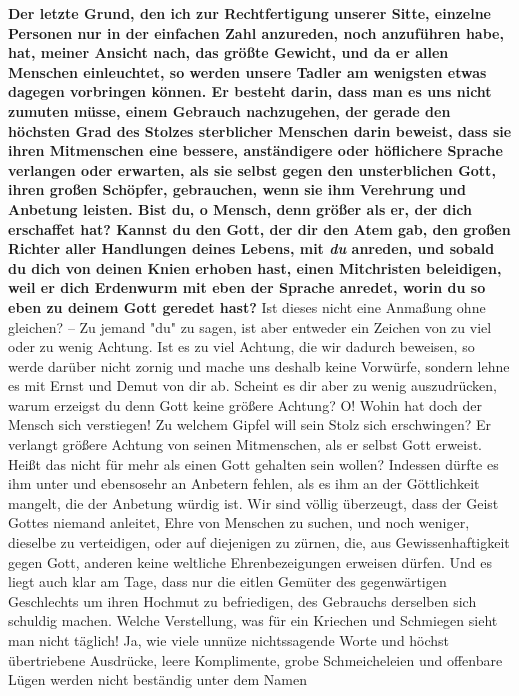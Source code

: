 \label{ref:10_08_duzen} \textbf{Der letzte Grund, den ich zur Rechtfertigung
unserer Sitte, einzelne Personen
nur in der einfachen Zahl anzureden, noch anzuführen habe, hat, meiner Ansicht
nach, das größte Gewicht, und da er allen Menschen einleuchtet, so werden unsere
Tadler am wenigsten etwas dagegen vorbringen können. Er besteht darin, dass man
es uns nicht zumuten müsse, einem Gebrauch nachzugehen, der gerade den
höchsten Grad des Stolzes sterblicher Menschen darin beweist, dass sie ihren
Mitmenschen eine bessere, anständigere oder höflichere Sprache verlangen oder
erwarten, als sie selbst gegen den unsterblichen Gott, ihren großen Schöpfer,
gebrauchen, wenn sie ihm Verehrung und Anbetung leisten.  Bist du, o Mensch, denn
größer als er, der dich erschaffet hat? Kannst du den Gott, der dir den Atem
gab, den großen Richter aller Handlungen deines Lebens, mit \textit{du}
anreden, und
sobald du dich von deinen Knien erhoben hast, einen Mitchristen beleidigen, weil
er dich Erdenwurm mit eben der Sprache anredet, worin du so
eben zu deinem Gott
geredet hast?} Ist dieses nicht eine Anmaßung ohne gleichen? -- Zu jemand "du" zu
sagen, ist aber entweder ein Zeichen von zu viel oder zu wenig Achtung. Ist
es zu viel Achtung, die wir dadurch beweisen, so werde darüber nicht zornig und
mache uns deshalb keine Vorwürfe, sondern lehne es mit Ernst und Demut von
dir ab. Scheint es dir aber zu wenig auszudrücken, warum erzeigst du denn Gott
keine größere Achtung? O! Wohin hat doch der Mensch sich verstiegen! Zu welchem
Gipfel will sein Stolz sich erschwingen? Er verlangt größere Achtung von seinen
Mitmenschen, als er selbst Gott erweist. Heißt das nicht für mehr als einen
Gott gehalten sein wollen? Indessen dürfte es ihm unter und ebensosehr an
Anbetern fehlen, als es ihm an der Göttlichkeit mangelt, die der Anbetung würdig
ist. Wir sind völlig überzeugt, dass der Geist Gottes niemand anleitet, Ehre von
Menschen zu suchen, und noch weniger, dieselbe zu verteidigen, oder auf
diejenigen zu zürnen, die, aus Gewissenhaftigkeit gegen Gott, anderen keine
weltliche Ehrenbezeigungen erweisen dürfen. Und es liegt auch klar am Tage, dass
nur die eitlen Gemüter des gegenwärtigen Geschlechts um ihren Hochmut zu
befriedigen, des Gebrauchs derselben sich schuldig machen. Welche Verstellung,
was für ein Kriechen und Schmiegen sieht man nicht täglich! Ja,
wie viele
unnüze nichtssagende Worte und höchst übertriebene Ausdrücke, leere Komplimente,
grobe Schmeicheleien und offenbare Lügen werden nicht beständig unter dem Namen
